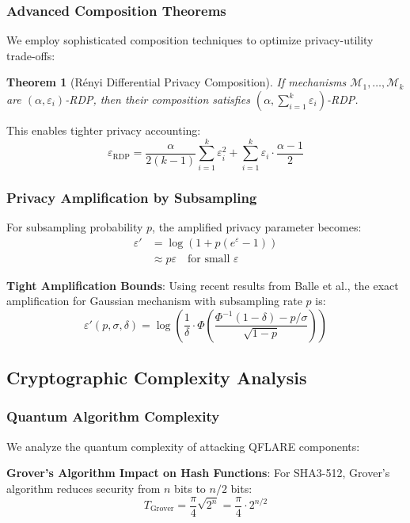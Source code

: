 \documentclass[onecolumn,11pt]{article}
\newtheorem{theorem}{Theorem}
\begin{document}
\subsubsection{Advanced Composition Theorems}

We employ sophisticated composition techniques to optimize privacy-utility trade-offs:

\begin{theorem}[Rényi Differential Privacy Composition]
If mechanisms $\mathcal{M}_1, \ldots, \mathcal{M}_k$ are $(\alpha, \varepsilon_i)$-RDP, then their composition satisfies $(\alpha, \sum_{i=1}^k \varepsilon_i)$-RDP.
\end{theorem}

This enables tighter privacy accounting:
$$\varepsilon_{\text{RDP}} = \frac{\alpha}{2(k-1)} \sum_{i=1}^k \varepsilon_i^2 + \sum_{i=1}^k \varepsilon_i \cdot \frac{\alpha-1}{2}$$

\subsubsection{Privacy Amplification by Subsampling}

For subsampling probability $p$, the amplified privacy parameter becomes:
\begin{align}
\varepsilon' &= \log\left(1 + p(e^\varepsilon - 1)\right) \\
&\approx p\varepsilon \quad \text{for small } \varepsilon
\end{align}

\textbf{Tight Amplification Bounds}: Using recent results from Balle et al., the exact amplification for Gaussian mechanism with subsampling rate $p$ is:
$$\varepsilon'(p, \sigma, \delta) = \log\left(\frac{1}{\delta} \cdot \Phi\left(\frac{\Phi^{-1}(1-\delta) - p/\sigma}{\sqrt{1-p}}\right)\right)$$

\subsection{Cryptographic Complexity Analysis}

\subsubsection{Quantum Algorithm Complexity}

We analyze the quantum complexity of attacking QFLARE components:

\textbf{Grover's Algorithm Impact on Hash Functions}:
For SHA3-512, Grover's algorithm reduces security from $n$ bits to $n/2$ bits:
$$T_{\text{Grover}} = \frac{\pi}{4}\sqrt{2^n} = \frac{\pi}{4} \cdot 2^{n/2}$$
\end{document}
